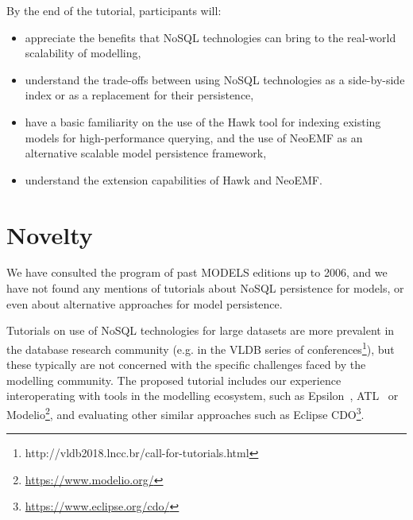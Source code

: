 \documentclass[conference]{IEEEtran}
\begin{document}
By the end of the tutorial, participants will:

\begin{itemize}
\item appreciate the benefits that NoSQL technologies can bring to the real-world scalability of modelling,
\item understand the trade-offs between using NoSQL technologies as a side-by-side index or as a replacement for their persistence,
\item have a basic familiarity on the use of the Hawk tool for indexing existing models for high-performance querying, and the use of NeoEMF as an alternative scalable model persistence framework,
\item understand the extension capabilities of Hawk and NeoEMF.
\end{itemize}

\section{Novelty}

We have consulted the program of past MODELS editions up to 2006, and we have
not found any mentions of tutorials about NoSQL persistence for models, or even
about alternative approaches for model persistence.

Tutorials on use of NoSQL technologies for large datasets are more prevalent in
the database research community (e.g. in the VLDB series of
conferences\footnote{http://vldb2018.lncc.br/call-for-tutorials.html}), but
these typically are not concerned with the specific challenges faced by the
modelling community. The proposed tutorial includes our experience
interoperating with tools in the modelling ecosystem, such as
Epsilon~\cite{EpsilonBook}, ATL~\cite{atl} or
Modelio\footnote{\url{https://www.modelio.org/}}, and evaluating other similar
approaches such as Eclipse CDO\footnote{\url{https://www.eclipse.org/cdo/}}.

%





\end{document}
